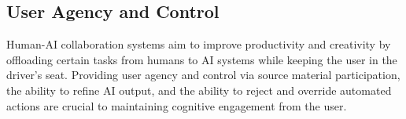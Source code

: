 




\subsection{User Agency and Control}
\label{sec:agency}

Human-AI collaboration systems aim to improve productivity and creativity by offloading certain tasks from humans to AI systems while keeping the user in the driver's seat. Providing user agency and control via source material participation, the ability to refine AI output, and the ability to reject and override automated actions are crucial to maintaining cognitive engagement from the user.

